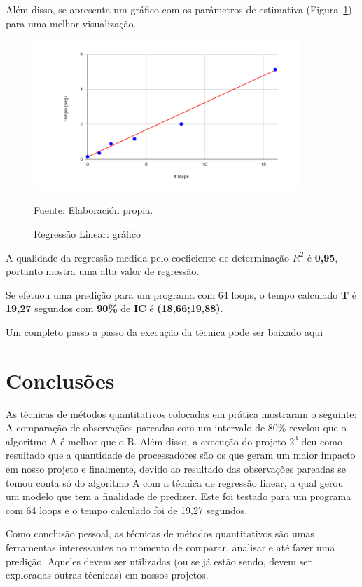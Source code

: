 \documentclass[12pt]{article}
\begin{document}
Além disso, se apresenta um gráfico com os parâmetros de estimativa (Figura~\ref{figure:regressao_graph}) para uma melhor visualização.

\begin{figure}[!ht]
	\begin{center}
		\includegraphics[width=0.9\textwidth]{images/regressao_graph}
	\end{center}
	\begin{center}
		\vskip -0.5cm
		\caption{\label{figure:regressao_graph}
			\small{Regressão Linear: gráfico}}
		{\small{Fuente: Elaboración propia.}}
	\end{center}
\end{figure}

A qualidade da regressão medida pelo coeficiente de determinação ${R^2}$ é \textbf{0,95}, portanto mostra uma alta valor de regressão.

Se efetuou uma predição para um programa com 64 loops, o tempo calculado \textbf{T} é \textbf{19,27}  segundos com \textbf{90\%} de \textbf{IC} é \textbf{(18,66;19,88)}.

Um completo passo a passo da execução da técnica pode ser baixado aqui 

\section{Conclusões}

As técnicas de métodos quantitativos colocadas em prática mostraram o seguinte: A comparação de observações pareadas com um intervalo de 80\% revelou que o algoritmo A é melhor que o B. Além disso, a execução do projeto ${2^3}$ deu como resultado que a quantidade de processadores são os que geram um maior impacto em nosso projeto e finalmente, devido ao resultado das observações pareadas se tomou conta só do algoritmo A com a técnica de regressão linear, a qual gerou um modelo que tem a finalidade de predizer. Este foi testado para um programa com 64 loops e o tempo calculado foi de 19,27 segundos.

Como conclusão pessoal, as técnicas de métodos quantitativos são umas ferramentas interessantes no momento de comparar, analisar e até fazer uma predição. Aqueles devem ser utilizadas (ou se já estão sendo, devem ser exploradas outras técnicas) em nossos projetos.




%


\end{document}
